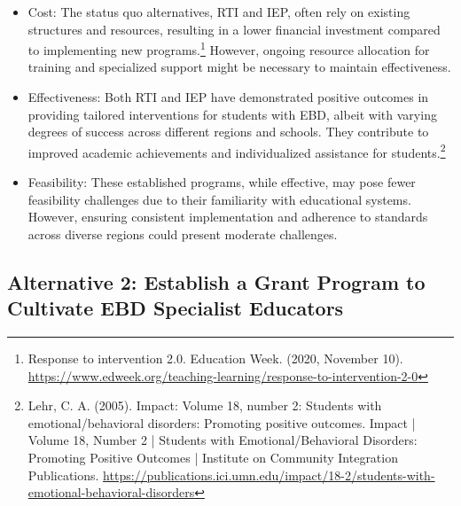 \documentclass[11pt]{article}
\begin{document}
\begin{itemize}
\item Cost: The status quo alternatives, RTI and IEP, often rely on existing structures and resources, resulting in a lower financial investment compared to implementing new programs.\footnote{Response to intervention 2.0. Education Week. (2020, November 10). \url{https://www.edweek.org/teaching-learning/response-to-intervention-2-0}} However, ongoing resource allocation for training and specialized support might be necessary to maintain effectiveness.
\item Effectiveness: Both RTI and IEP have demonstrated positive outcomes in providing tailored interventions for students with EBD, albeit with varying degrees of success across different regions and schools. They contribute to improved academic achievements and individualized assistance for students.\footnote{Lehr, C. A. (2005). Impact: Volume 18, number 2: Students with emotional/behavioral disorders: Promoting positive outcomes. Impact | Volume 18, Number 2 | Students with Emotional/Behavioral Disorders: Promoting Positive Outcomes | Institute on Community Integration Publications. \url{https://publications.ici.umn.edu/impact/18-2/students-with-emotional-behavioral-disorders}}
\item Feasibility: These established programs, while effective, may pose fewer feasibility challenges due to their familiarity with educational systems. However, ensuring consistent implementation and adherence to standards across diverse regions could present moderate challenges.
\end{itemize}

\subsection{Alternative 2: Establish a Grant Program to Cultivate EBD Specialist Educators}
\end{document}

